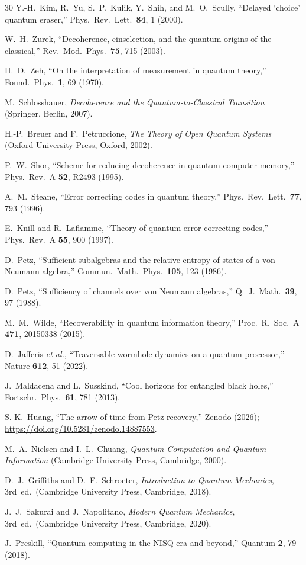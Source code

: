 \documentclass[amsmath,amssymb,reprint,aps,prb]{revtex4-2}
\begin{document}
\begin{thebibliography}{30}
Y.-H.~Kim, R.~Yu, S.~P.~Kulik, Y.~Shih, and M.~O.~Scully,
``Delayed `choice' quantum eraser,''
Phys.\ Rev.\ Lett.\ \textbf{84}, 1 (2000).

W.~H.~Zurek,
``Decoherence, einselection, and the quantum origins of the
classical,''
Rev.\ Mod.\ Phys.\ \textbf{75}, 715 (2003).

H.~D.~Zeh,
``On the interpretation of measurement in quantum theory,''
Found.\ Phys.\ \textbf{1}, 69 (1970).

M.~Schlosshauer,
\textit{Decoherence and the Quantum-to-Classical Transition}
(Springer, Berlin, 2007).

H.-P.~Breuer and F.~Petruccione,
\textit{The Theory of Open Quantum Systems}
(Oxford University Press, Oxford, 2002).

P.~W.~Shor,
``Scheme for reducing decoherence in quantum computer memory,''
Phys.\ Rev.\ A \textbf{52}, R2493 (1995).

A.~M.~Steane,
``Error correcting codes in quantum theory,''
Phys.\ Rev.\ Lett.\ \textbf{77}, 793 (1996).

E.~Knill and R.~Laflamme,
``Theory of quantum error-correcting codes,''
Phys.\ Rev.\ A \textbf{55}, 900 (1997).

D.~Petz,
``Sufficient subalgebras and the relative entropy of states of a
von Neumann algebra,''
Commun.\ Math.\ Phys.\ \textbf{105}, 123 (1986).

D.~Petz,
``Sufficiency of channels over von Neumann algebras,''
Q.\ J.\ Math.\ \textbf{39}, 97 (1988).

M.~M.~Wilde,
``Recoverability in quantum information theory,''
Proc.\ R.\ Soc.\ A \textbf{471}, 20150338 (2015).

D.~Jafferis \textit{et al.},
``Traversable wormhole dynamics on a quantum processor,''
Nature \textbf{612}, 51 (2022).

J.~Maldacena and L.~Susskind,
``Cool horizons for entangled black holes,''
Fortschr.\ Phys.\ \textbf{61}, 781 (2013).

S.-K.~Huang,
``The arrow of time from Petz recovery,''
Zenodo (2026);
\url{https://doi.org/10.5281/zenodo.14887553}.

M.~A.~Nielsen and I.~L.~Chuang,
\textit{Quantum Computation and Quantum Information}
(Cambridge University Press, Cambridge, 2000).

D.~J.~Griffiths and D.~F.~Schroeter,
\textit{Introduction to Quantum Mechanics}, 3rd~ed.\
(Cambridge University Press, Cambridge, 2018).

J.~J.~Sakurai and J.~Napolitano,
\textit{Modern Quantum Mechanics}, 3rd~ed.\
(Cambridge University Press, Cambridge, 2020).

J.~Preskill,
``Quantum computing in the NISQ era and beyond,''
Quantum \textbf{2}, 79 (2018).

\end{thebibliography}
\end{document}
